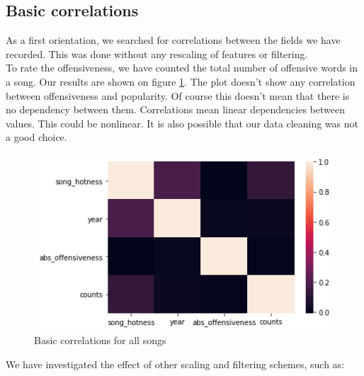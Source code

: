 \documentclass[11pt]{article}
\begin{document}
\subsection{Basic correlations}

As a first orientation, we searched for correlations between the fields we have recorded. This was done without any rescaling of features or filtering.\\
To rate the offensiveness, we have counted the total number of offensive words in a song.
Our results are shown on figure \ref{basic_correlations}. The plot doesn't show any correlation between offensiveness and popularity. Of course this doesn't mean that there is no dependency between them.
Correlations mean linear dependencies between values. This could be nonlinear. It is also possible that our data cleaning was not a good choice.
\begin{figure}

\includegraphics{plots/basic_correlations}
\caption{Basic correlations for all songs}
\label{basic_correlations}
\end{figure}

We have investigated the effect of other scaling and filtering schemes, such as:
\end{document}
